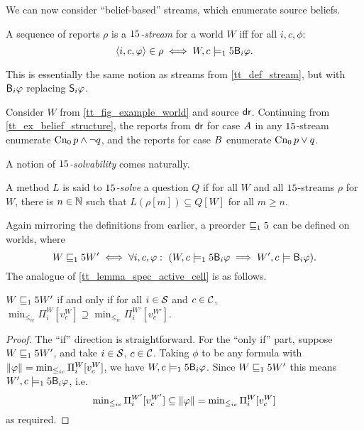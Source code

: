 We can now consider ``belief-based'' streams, which enumerate source beliefs.

\begin{definition}
    A sequence of reports $\rho$ is a \emph{$\b$-stream} for a world $W$ iff for
    all $i, c, \phi$:
    \[
        \tuple{i, c, \phi} \in \rho \iff W, c \models_\b \B_i\phi.
    \]
\end{definition}

This is essentially the same notion as streams from \cref{tt_def_stream}, but
with $\B_i\phi$ replacing $\S_i\phi$.

\begin{example}
    Consider $W$ from \cref{tt_fig_example_world} and source $\dr$. Continuing
    from \cref{tt_ex_belief_structure}, the reports from $\dr$ for case
    $\patientA$ in any $\b$-stream enumerate $\cnprop{p \land \neg{q}}$, and
    the reports for case $\patientB$ enumerate $\cnprop{p \lor q}$.
\end{example}

A notion of \emph{$\b$-solvability} comes naturally.

\begin{definition}
    A method $L$ is said  to \emph{$\b$-solve} a question $Q$ if for all $W$ and
    all $\b$-streams $\rho$ for $W$, there is $n \in \N$ such that $L(\rho[m])
    \subseteq Q[W]$ for all $m \ge n$.
\end{definition}

Again mirroring the definitions from earlier, a preorder $\specleq_\b$ can be
defined on worlds, where
\[
    W \specleq_\b W'
    \iff
    \forall i, c, \phi:\
        (W, c \models_\b \B_i\phi \implies W', c \models \B_i\phi).
\]
The analogue of \cref{tt_lemma_spec_active_cell} is as follows.

\begin{lemma}
    \label{tt_lemma_specleq_b}
    $W \specleq_\b W'$ if and only if for all $i \in \srcs$ and $c \in \css$,
    $\min_{\le_{ic}}{\Pi^W_i[v^W_c]} \supseteq
    \min_{\le_{ic}}{\Pi^{W'}_i[v^{W'}_c]}$.
\end{lemma}

\begin{proof}
    The ``if'' direction is straightforward. For the ``only if'' part, suppose
    $W \specleq_\b W'$, and take $i \in \srcs$, $c \in \css$. Taking $\phi$ to
    be any formula with $\propmods{\phi} = \min_{\le_{ic}}{\Pi^W_i[v^W_c]}$, we
    have $W, c \models_\b \B_i\phi$. Since $W \specleq_\b W'$ this means $W', c
    \models_\b \B_i\phi$, i.e.
    \[
        \min\nolimits_{\le_{ic}}{\Pi^{W'}_i[v^{W'}_c]}
        \subseteq \propmods{\phi}
        = \min\nolimits_{\le_{ic}}{\Pi^W_i[v^W_c]}
    \]
    as required.
\end{proof}

